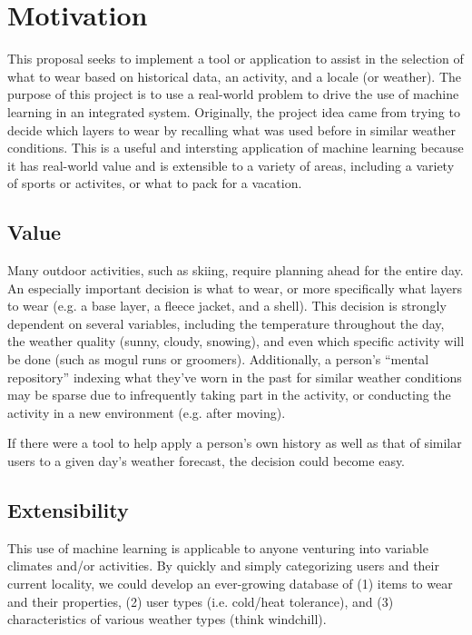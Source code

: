 \section{Motivation}
\label{section:motivation}
This proposal seeks to implement a tool or application to assist in the selection of what to wear based on
historical data, an activity, and a locale (or weather). The purpose of this project is to use a real-world
problem to drive the use of machine learning in an integrated system. Originally, the project idea came from trying
to decide which layers to wear by recalling what was used before in similar weather conditions. This is a
useful and intersting application of machine learning because it has real-world value and is extensible to a variety
of areas, including a variety of sports or activites, or what to pack for a vacation.

\subsection{Value}
Many outdoor activities, such as skiing, require planning ahead for the entire day. An especially important
decision is what to wear, or more specifically what layers to wear (e.g. a base layer, a fleece jacket, and a shell).
This decision is strongly dependent on several variables, including the temperature throughout the day, the weather
quality (sunny, cloudy, snowing), and even which specific activity will be done (such as mogul runs or groomers).
Additionally, a person's ``mental repository'' indexing what they've worn in the past for similar weather conditions
may be sparse due to infrequently taking part in the activity, or conducting the activity in a new environment (e.g.
after moving).

If there were a tool to help apply a person's own history as well as that of similar users to a given day's weather
forecast, the decision could become easy.

\subsection{Extensibility}
This use of machine learning is applicable to anyone venturing into variable climates and/or activities.
By quickly and simply categorizing
users and their current locality, we could develop an ever-growing database of (1) items to wear and their properties,
(2) user types (i.e. cold/heat tolerance), and (3) characteristics of various weather types (think windchill).

